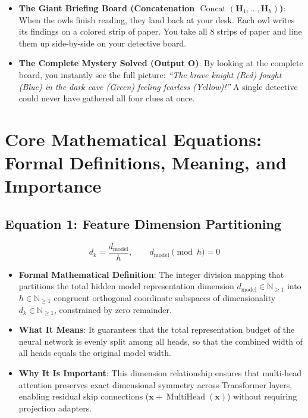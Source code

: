 \documentclass[11pt,a4paper]{article}
\theoremstyle{definition}
\begin{document}
\begin{itemize}
    \item \textbf{The Giant Briefing Board (Concatenation $\operatorname{Concat}(\mathbf{H}_1, \dots, \mathbf{H}_h)$)}:
    When the owls finish reading, they land back at your desk. Each owl writes its findings on a colored strip of paper. You take all 8 strips of paper and line them up side-by-side on your detective board.
    
    \item \textbf{The Complete Mystery Solved (Output $\mathbf{O}$)}:
    By looking at the complete board, you instantly see the full picture: \emph{``The brave knight (Red) fought (Blue) in the dark cave (Green) feeling fearless (Yellow)!''} A single detective could never have gathered all four clues at once.
\end{itemize}

\section{Core Mathematical Equations: Formal Definitions, Meaning, and Importance}

\subsection{\textbf{Equation 1: Feature Dimension Partitioning}}
{\boldmath
\begin{equation}
d_k = \frac{d_{\text{model}}}{h}, \qquad d_{\text{model}} \pmod h = 0
\end{equation}
}
\begin{itemize}
    \item \textbf{Formal Mathematical Definition}:
    The integer division mapping that partitions the total hidden model representation dimension $d_{\text{model}} \in \mathbb{N}_{\ge 1}$ into $h \in \mathbb{N}_{\ge 1}$ congruent orthogonal coordinate subspaces of dimensionality $d_k \in \mathbb{N}_{\ge 1}$, constrained by zero remainder.
    \item \textbf{What It Means}:
    It guarantees that the total representation budget of the neural network is evenly split among all heads, so that the combined width of all heads equals the original model width.
    \item \textbf{Why It Is Important}:
    This dimension relationship ensures that multi-head attention preserves exact dimensional symmetry across Transformer layers, enabling residual skip connections ($\mathbf{x} + \operatorname{MultiHead}(\mathbf{x})$) without requiring projection adapters.
\end{itemize}
\end{document}
